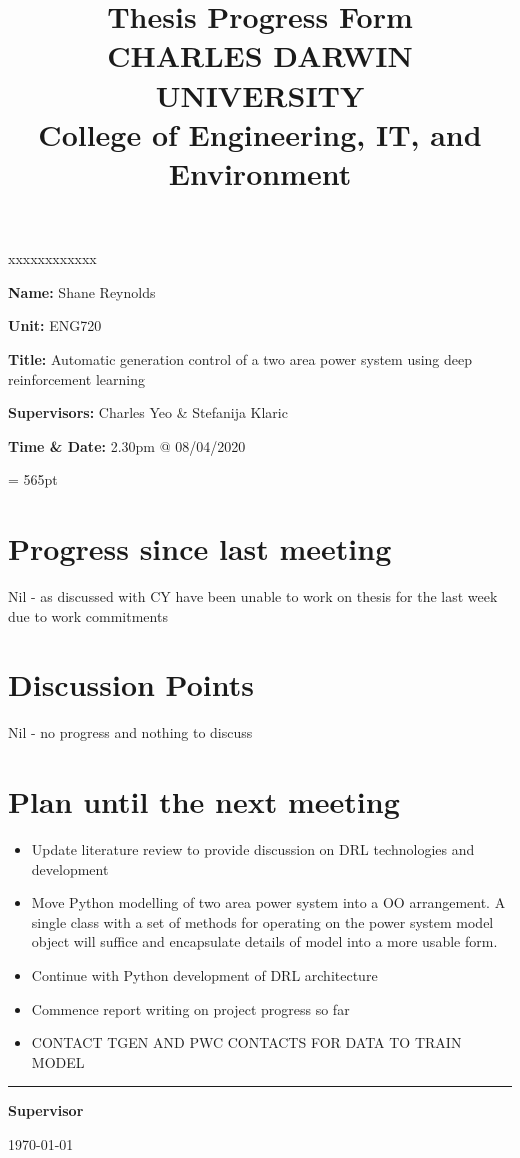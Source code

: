 \documentclass[12pt]{article}
\title{	
		Thesis Progress Form\\
		CHARLES DARWIN UNIVERSITY\\
		College of Engineering, IT, and Environment
	  }
\author{}
\date{}
\begin{document}
	
	\maketitle
	
	\begin{namelist}{xxxxxxxxxxxx}
		\item[{\bf Name:}]
			Shane Reynolds
		\item[{\bf Unit:}]
			ENG720
		\item[{\bf Title:}]
			Automatic generation control of a two area power system using deep reinforcement learning
		\item[{\bf Supervisors:}]
			Charles Yeo \& Stefanija Klaric
		\item[{\bf Time \& Date:}] 2.30pm @ 08/04/2020
			
	\end{namelist}
	
	\pagestyle{plain} %
	\textheight = 565pt %
	
	\section{Progress since last meeting}
	Nil - as discussed with CY have been unable to work on thesis for the last week due to work commitments
	
	\section{Discussion Points}
	Nil - no progress and nothing to discuss
	
	\section{Plan until the next meeting}
	\begin{itemize}
		\item Update literature review to provide discussion on DRL technologies and development
		\item Move Python modelling of two area power system into a OO arrangement. A single class with a set of methods for operating on the power system model object will suffice and encapsulate details of model into a more usable form. 
		\item Continue with Python development of DRL architecture
		\item Commence report writing on project progress so far
		\item CONTACT TGEN AND PWC CONTACTS FOR DATA TO TRAIN MODEL
	\end{itemize}
	\par
	\vspace{\fill}%
	\noindent\rule{0.4\linewidth}{0.5pt}%
	\vspace{1em}%
	\par
	\noindent\textbf{Supervisor}\vspace{1em}%
	\par
	\noindent\today
\end{document}
